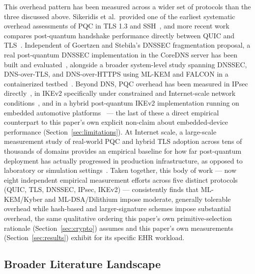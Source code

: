 \documentclass[journal]{IEEEtran}
\begin{document}
This overhead pattern has been measured across a wider set of protocols than the three discussed above. Sikeridis et al.\ provided one of the earliest systematic overhead assessments of PQC in TLS 1.3 and SSH~\cite{sikeridis2020tlsoverhead}, and more recent work compares post-quantum handshake performance directly between QUIC and TLS~\cite{quictlscomparative2025}. Independent of Goertzen and Stebila's DNSSEC fragmentation proposal, a real post-quantum DNSSEC implementation in the CoreDNS server has been built and evaluated~\cite{corednspqc2025}, alongside a broader system-level study spanning DNSSEC, DNS-over-TLS, and DNS-over-HTTPS using ML-KEM and FALCON in a containerized testbed~\cite{dnssystemstudy2025}. Beyond DNS, PQC overhead has been measured in IPsec directly~\cite{ipsecpqcicisc2022}, in IKEv2 specifically under constrained and Internet-scale network conditions~\cite{ikev2constrained2024}, and in a hybrid post-quantum IKEv2 implementation running on embedded automotive platforms~\cite{automotiveikev2hybrid2026} --- the last of these a direct empirical counterpart to this paper's own explicit non-claim about embedded-device performance (Section~\ref{sec:limitations}). At Internet scale, a large-scale measurement study of real-world PQC and hybrid TLS adoption across tens of thousands of domains provides an empirical baseline for how far post-quantum deployment has actually progressed in production infrastructure, as opposed to laboratory or simulation settings~\cite{pqreadinessinternet2026}. Taken together, this body of work --- now eight independent empirical measurement efforts across five distinct protocols (QUIC, TLS, DNSSEC, IPsec, IKEv2) --- consistently finds that ML-KEM/Kyber and ML-DSA/Dilithium impose moderate, generally tolerable overhead while hash-based and larger-signature schemes impose substantial overhead, the same qualitative ordering this paper's own primitive-selection rationale (Section~\ref{sec:crypto}) assumes and this paper's own measurements (Section~\ref{sec:results}) exhibit for its specific EHR workload.

\subsection{Broader Literature Landscape}
\end{document}
